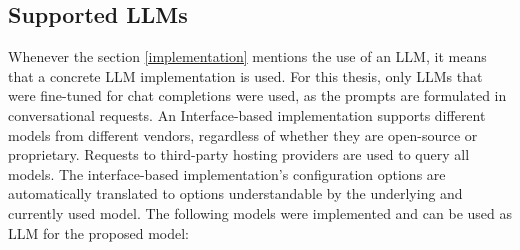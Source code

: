 \documentclass[draft,final]{thesisclass} %
\begin{document}
\subsection{Supported \gls{LLM}s}
Whenever the section \ref{implementation} mentions the use of an \gls{LLM}, it means that a concrete \gls{LLM} implementation is used.
For this thesis, only \gls{LLM}s that were fine-tuned for chat completions were used, as the prompts are formulated in conversational requests.
An Interface-based implementation supports different models from different vendors, regardless of whether they are open-source or proprietary.
Requests to third-party hosting providers are used to query all models. The interface-based implementation's configuration options are automatically translated to options understandable by the underlying and currently used model.
The following models were implemented and can be used as \gls{LLM} for the proposed model:
\end{document}
